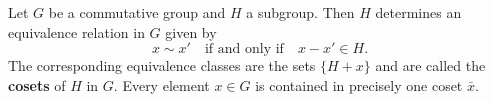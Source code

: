 Let $G$ be a commutative group and $H$ a subgroup. Then $H$ determines an equivalence relation in $G$ given by
$$x \sim x' \quad \text{if and only if} \quad x - x' \in H.$$
The corresponding equivalence classes are the sets $\{H + x\}$ and are called the \textbf{cosets} of $H$ in $G$. Every element $x \in G$ is contained in precisely one coset $\bar{x}$.
